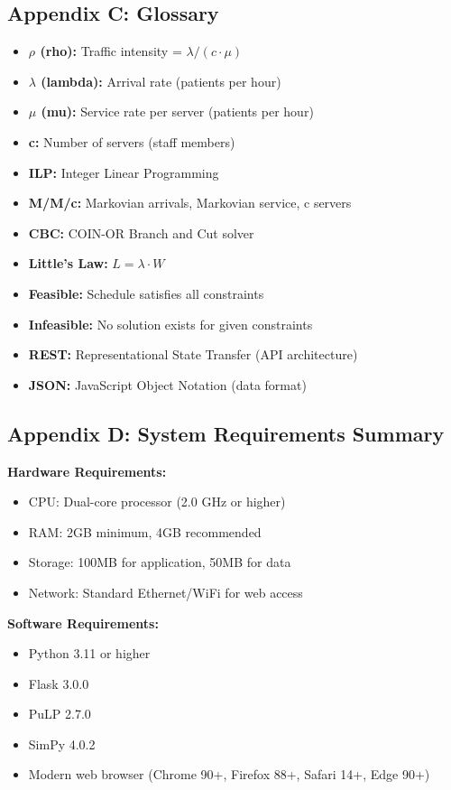 \documentclass[12pt,a4paper]{article}
\begin{document}
\subsection{Appendix C: Glossary}
\label{appendix:glossary}

\begin{itemize}
    \item \textbf{$\rho$ (rho):} Traffic intensity = $\lambda/(c \cdot \mu)$
    \item \textbf{$\lambda$ (lambda):} Arrival rate (patients per hour)
    \item \textbf{$\mu$ (mu):} Service rate per server (patients per hour)
    \item \textbf{c:} Number of servers (staff members)
    \item \textbf{ILP:} Integer Linear Programming
    \item \textbf{M/M/c:} Markovian arrivals, Markovian service, c servers
    \item \textbf{CBC:} COIN-OR Branch and Cut solver
    \item \textbf{Little's Law:} $L = \lambda \cdot W$
    \item \textbf{Feasible:} Schedule satisfies all constraints
    \item \textbf{Infeasible:} No solution exists for given constraints
    \item \textbf{REST:} Representational State Transfer (API architecture)
    \item \textbf{JSON:} JavaScript Object Notation (data format)
\end{itemize}

\subsection{Appendix D: System Requirements Summary}
\label{appendix:requirements}

\noindent\textbf{Hardware Requirements:}
\begin{itemize}
    \item CPU: Dual-core processor (2.0 GHz or higher)
    \item RAM: 2GB minimum, 4GB recommended
    \item Storage: 100MB for application, 50MB for data
    \item Network: Standard Ethernet/WiFi for web access
\end{itemize}

\textbf{Software Requirements:}
\begin{itemize}
    \item Python 3.11 or higher
    \item Flask 3.0.0
    \item PuLP 2.7.0
    \item SimPy 4.0.2
    \item Modern web browser (Chrome 90+, Firefox 88+, Safari 14+, Edge 90+)
\end{itemize}
\end{document}
